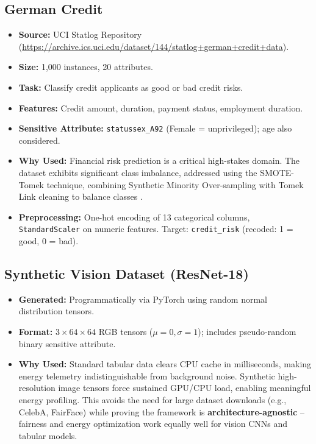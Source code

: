 \documentclass[12pt,a4paper]{article}
\begin{document}
\subsection{German Credit}

\begin{itemize}
    \item \textbf{Source:} UCI Statlog Repository (\url{https://archive.ics.uci.edu/dataset/144/statlog+german+credit+data}).
    \item \textbf{Size:} 1,000 instances, 20 attributes.
    \item \textbf{Task:} Classify credit applicants as good or bad credit risks.
    \item \textbf{Features:} Credit amount, duration, payment status, employment duration.
    \item \textbf{Sensitive Attribute:} \texttt{statussex\_A92} (Female = unprivileged); age also considered.
    \item \textbf{Why Used:} Financial risk prediction is a critical high-stakes domain. The dataset exhibits significant class imbalance, addressed using the SMOTE-Tomek technique, combining Synthetic Minority Over-sampling with Tomek Link cleaning to balance classes \cite{nagpal2024multiobj}.
    \item \textbf{Preprocessing:} One-hot encoding of 13 categorical columns, \texttt{StandardScaler} on numeric features. Target: \texttt{credit\_risk} (recoded: 1 = good, 0 = bad).
\end{itemize}

\subsection{Synthetic Vision Dataset (ResNet-18)}

\begin{itemize}
    \item \textbf{Generated:} Programmatically via PyTorch using random normal distribution tensors.
    \item \textbf{Format:} $3 \times 64 \times 64$ RGB tensors ($\mu=0, \sigma=1$); includes pseudo-random binary sensitive attribute.
    \item \textbf{Why Used:} Standard tabular data clears CPU cache in milliseconds, making energy telemetry indistinguishable from background noise. Synthetic high-resolution image tensors force sustained GPU/CPU load, enabling meaningful energy profiling. This avoids the need for large dataset downloads (e.g., CelebA, FairFace) while proving the framework is \textbf{architecture-agnostic} -- fairness and energy optimization work equally well for vision CNNs and tabular models.
\end{itemize}
\end{document}
